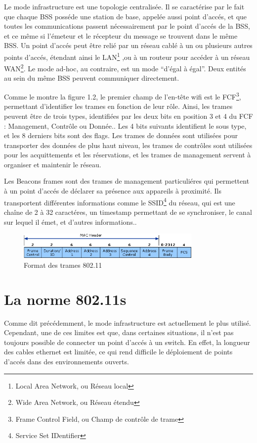 Le mode infrastructure est une topologie centralisée. Il se caractérise par le fait que chaque BSS posséde une station de
base, appelée aussi point d'accés, et que toutes les communications passent nécessairement par le point d'accés de la BSS,
et ce même si l'émeteur et le récepteur du message se trouvent dans le même BSS. Un point d'accés peut être relié par un réseau
cablé à un ou plusieurs autres points d'accés, étendant ainsi le LAN\footnote{Local Area Network, ou Réseau local}
\cite{WFfunc},ou à un routeur pour accéder à un réseau WAN\footnote{Wide Area Network, ou Réseau étendu}.
Le mode ad-hoc, au contraire, est un mode ``d'égal à égal''. Deux entités au sein du même BSS peuvent communiquer directement.


Comme le montre la figure 1.2\cite{WFhead}, le premier champ de l'en-tête wifi est le FCF\footnote{Frame Control Field, ou Champ
de contrôle de trame}, permettant d'identifier les trames en fonction de leur rôle. Ainsi, les trames peuvent être de trois types,
identifiées par les deux bits en position 3 et 4 du FCF : Management, Contrôle ou Donnée.\cite{WFfcf}. Les 4 bits suivants
identifient le sous type, et les 8 derniers bits sont des flags. Les trames de données sont utilisées pour transporter des données
de plus haut niveau, les trames de contrôles sont utilisées pour les acquittements et les réservations, et les trames de management
servent à organiser et maintenir le réseau\cite{MNfunc}.

Les Beacons frames sont des trames de management particuliéres qui permettent à un point d'accés de déclarer sa présence aux
appareils à proximité. Ils transportent différentes informations comme le SSID\footnote{Service Set IDentifier} du réseau,
qui est une chaîne de 2 à 32 caractéres, un timestamp permettant de se synchroniser, le canal sur lequel il émet, 
et d'autres informations.\cite{WFfunc2}.
\begin{figure}
   \centering
   \includegraphics[width=0.8\textwidth,natwidth=488,natheight=513]{images/header_wifi.png}
   \caption{Format des trames 802.11}
\end{figure}

\section{La norme 802.11s}
Comme dit précédemment, le mode infrastructure est actuellement le plus utilisé. Cependant, une de ces limites est
que, dans certaines situations, il n'est pas toujours possible de connecter un point d'accés à un switch\cite{MNintro}.
En effet, la longueur des cables ethernet est limitée, ce qui rend difficile le déploiement de points d'accés dans des
environnements ouverts.

